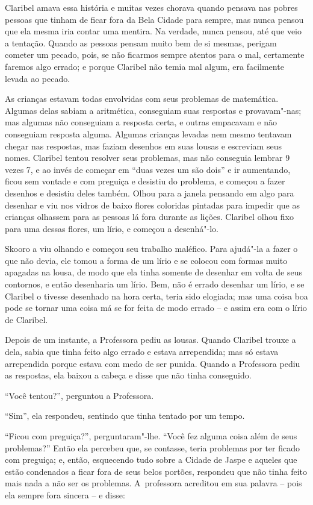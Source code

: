 Claribel amava essa história e muitas vezes chorava quando pensava nas
pobres pessoas que tinham de ficar fora da Bela Cidade para sempre, mas
nunca pensou que ela mesma iria contar uma mentira. Na verdade,
nunca pensou, até que veio a tentação. Quando as pessoas pensam muito
bem de si mesmas, perigam cometer um pecado, pois, se não ficarmos
sempre atentos para o mal, certamente faremos algo errado; e porque
Claribel não temia mal algum, era facilmente levada ao pecado.

As crianças estavam todas envolvidas com seus problemas de matemática. Algumas
delas sabiam a aritmética, conseguiam suas respostas e provavam"-nas; mas
algumas não conseguiam a resposta certa, e outras empacavam e não
conseguiam resposta alguma. Algumas crianças levadas nem mesmo tentavam
chegar nas respostas, mas faziam desenhos em suas lousas e escreviam
seus nomes. Claribel tentou resolver seus problemas, mas não
conseguia lembrar 9 vezes 7, e ao invés de começar em ``duas vezes um
são dois'' e ir aumentando, ficou sem vontade e com preguiça e
desistiu do problema, e começou a fazer desenhos e desistiu deles também.
Olhou para a janela pensando em algo para desenhar e viu nos vidros
de baixo flores coloridas pintadas para impedir que as crianças olhassem
para as pessoas lá fora durante as lições. Claribel olhou fixo para uma
dessas flores, um lírio, e começou a desenhá"-lo.



Skooro a viu olhando e começou seu trabalho maléfico. Para ajudá"-la a
fazer o que não devia, ele tomou a forma de um lírio e se colocou com
formas muito apagadas na lousa, de modo que ela tinha somente de desenhar
em volta de seus contornos, e então desenharia um lírio. Bem, não
é errado desenhar um lírio, e se Claribel o tivesse desenhado na hora
certa, teria sido elogiada; mas uma coisa boa pode se tornar uma
coisa má se for feita de modo errado -- e assim era com o lírio de
Claribel.

Depois de um instante, a Professora pediu as lousas. Quando Claribel
trouxe a dela, sabia que tinha feito algo errado e estava arrependida; mas só
estava arrependida porque estava com medo de ser punida. Quando a
Professora pediu as respostas, ela baixou a cabeça e disse que não
tinha conseguido.

``Você tentou?'', perguntou a Professora.

``Sim'', ela respondeu, sentindo que tinha tentado por um tempo.

``Ficou com preguiça?'', perguntaram"-lhe. ``Você fez alguma coisa além de
seus problemas?'' Então ela percebeu que, se contasse, teria problemas por
ter ficado com preguiça; e, então, esquecendo tudo sobre a Cidade de Jaspe
e aqueles que estão condenados a ficar fora de seus belos portões,
respondeu que não tinha feito mais nada a não ser os problemas. A~professora acreditou em sua palavra -- pois ela sempre fora sincera
-- e disse:

